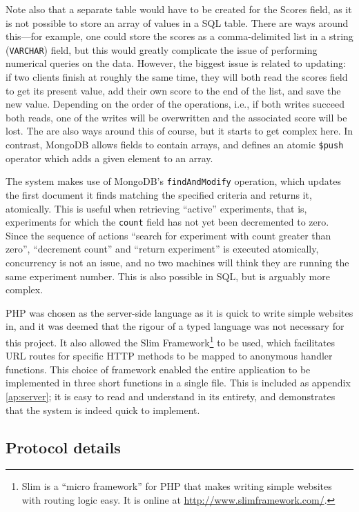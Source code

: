 Note also that a separate table would have to be created for the Scores field, as it is not possible to store an array of values in a SQL table.  There are ways around this---for example, one could store the scores as a comma-delimited list in a string ({\tt VARCHAR}) field, but this would greatly complicate the issue of performing numerical queries on the data.  However, the biggest issue is related to updating: if two clients finish at roughly the same time, they will both read the scores field to get its present value, add their own score to the end of the list, and save the new value.  Depending on the order of the operations, i.e., if both writes succeed both reads, one of the writes will be overwritten and the associated score will be lost.  The are also ways around this of course, but it starts to get complex here.  In contrast, MongoDB allows fields to contain arrays, and defines an atomic {\tt\$push} operator which adds a given element to an array.

The system makes use of MongoDB's {\tt findAndModify} operation, which updates the first document it finds matching the specified criteria and returns it, atomically.  This is useful when retrieving ``active'' experiments, that is, experiments for which the {\tt count} field has not yet been decremented to zero.  Since the sequence of actions ``search for experiment with count greater than zero'', ``decrement count'' and ``return experiment'' is executed atomically, concurrency is not an issue, and no two machines will think they are running the same experiment number.  This is also possible in SQL, but is arguably more complex.

PHP was chosen as the server-side language as it is quick to write simple websites in, and it was deemed that the rigour of a typed language was not necessary for this project.  It also allowed the Slim Framework\footnote{Slim is a ``micro framework'' for PHP that makes writing simple websites with routing logic easy.  It is online at \url{http://www.slimframework.com/}.} to be used, which facilitates URL routes for specific HTTP methods to be mapped to anonymous handler functions.  This choice of framework enabled the entire application to be implemented in three short functions in a single file.  This is included as appendix \ref{ap:server}; it is easy to read and understand in its entirety, and demonstrates that the system is indeed quick to implement.

\subsection{Protocol details}

